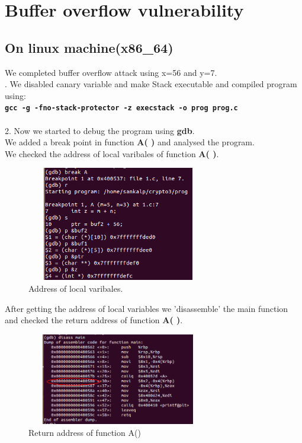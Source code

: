 \documentclass{article}
\begin{document}
\section{Buffer overflow vulnerability}
  \subsection{On linux machine(x86\_64)}
  We completed buffer overflow attack using  x=56 and y=7.\\
        
  . We disabled canary variable and make Stack executable and compiled program using:\\
  \textbf{\tt gcc -g -fno-stack-protector -z execstack -o prog prog.c}\\\\
  2. Now we started to debug the program using \textbf{gdb}.\\
    We added a break point in function \textbf{A( )} and analysed the program.\\
    We checked the address of local varibales of function \textbf{A( )}.\\
  
  \begin{figure}[htb]
   \begin{center}
		\includegraphics[width=8cm,height=5cm]{bo.png}
	\caption{Address of local varibales.}
	 \end{center}
	\end{figure}
      After getting the address of local variables we 'disassemble' the main function
      and checked the return address of function \textbf{A( )}.\\
      
       
   
   \begin{figure}[htb]
     \begin{center}
		\includegraphics[width=8cm,height=4cm]{bo1.png}
	\caption{Return address of function A()}
	 \end{center}
	\end{figure}
        
\end{document}
